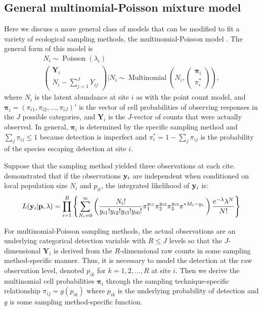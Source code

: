 \documentclass[article,shortnames]{jss}
\DeclareMathOperator{\Poi}{Poisson}
\DeclareMathOperator{\MN}{Multinomial}
\begin{document}
     
\subsection{General multinomial-Poisson mixture model}
\label{sec:gener-mult-poiss}
Here we discuss a more general class of models that can be modified to fit a
variety of ecological sampling methods, the multinomial-Poisson model
\citep{Royle2004a}.  The general form of this model is
\begin{gather}
  N_i \sim \Poi(\lambda_i) \label{eq:mp2} \\
  \begin{pmatrix}
    \mathbf Y_i\\
    N_{i} - \sum_{j=1}^{J} Y_{ij}
  \end{pmatrix}
  \bigg| N_{i} \sim \MN\left(N_i, 
  \begin{pmatrix}
    \boldsymbol \pi_i \\
    \pi_{i}^{*}
  \end{pmatrix}\right),
\end{gather}
where $N_i$ is the latent abundance at site $i$ as with the point
count model, and $\boldsymbol \pi_i=(\pi_{i1},\pi_{i2},\dots,\pi_{iJ})'$ is
the vector of cell probabilities of observing responses in the $J$
possible categories, and $\mathbf Y_{i}$ is the $J$-vector of counts
that were actually observed.  In general, $\boldsymbol \pi_i$ is
determined by the specific sampling method and
$\sum_{j} \pi_{ij} \le 1$ because detection is imperfect and
$\pi_{i}^{*}=1 - \sum_{j} \pi_{ij}$ is the probability of the species
escaping detection at site $i$.  

Suppose that the sampling method yielded three observations at each cite. \citet{Royle2004a} demonstrated that if the observations ${\bf y}_i$ are independent when conditioned on local population size $N_i$ and $p_{it}$, the integrated likelihood of ${\bf y}_{i}$ is:
\begin{equation}
L({\bf y}_i| {\bf p},\lambda) = 
 \prod_{i=1}^{R} \left\{ 
  \sum_{N_{i}=0}^{\infty} \left(
 \frac{N_{i}!}{ y_{i1}! y_{i2}! y_{i3}! y_{i0}!}
  \pi_{1}^{y_{i1}}
  \pi_{2}^{y_{i2}}
  \pi_{3}^{y_{i3}}
  \pi^{*M_{i}- y_{i.}} \right)
 \frac{e^{-\lambda} \lambda^N}{N!} \right\}
\end{equation}

For multinomial-Poisson sampling methods, the actual observations are
an underlying categorical detection variable with $R \leq J$ levels so
that the $J$-dimensional $\mathbf Y_{i}$ is derived from the
$R$-dimensional raw counts in some sampling method-specific manner.
Thus, it is necessary to model the detection at the raw observation
level, denoted $p_{ik}$ for $k=1,2,\dots,R$ at site $i$.  Then we
derive the multinomial cell probabilities $\boldsymbol \pi_{i}$
through the sampling technique-specific relationship
$\pi_{ij}=g(p_{ik})$ where $p_{ik}$ is the underlying probability of
detection and $g$ is some sampling method-specific function.  
\end{document}
